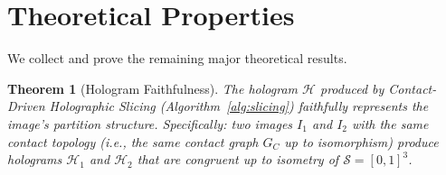 \documentclass[twocolumn]{article}
\theoremstyle{plain}
\newtheorem{theorem}{Theorem}[section]
\theoremstyle{definition}
\newcommand{\GC}{G_C}
\newcommand{\SS}{\mathcal{S}}
\newcommand{\HH}{\mathcal{H}}
\begin{document}
\section{Theoretical Properties}
\label{sec:properties}

We collect and prove the remaining major theoretical results.

\begin{theorem}[Hologram Faithfulness]
\label{thm:faithfulness}
The hologram $\HH$ produced by Contact-Driven Holographic Slicing
(Algorithm~\ref{alg:slicing}) faithfully represents the image's partition
structure. Specifically: two images $I_1$ and $I_2$ with the same contact
topology (i.e., the same contact graph $\GC$ up to isomorphism) produce holograms
$\HH_1$ and $\HH_2$ that are congruent up to isometry of $\SS = [0,1]^3$.
\end{theorem}
\end{document}
